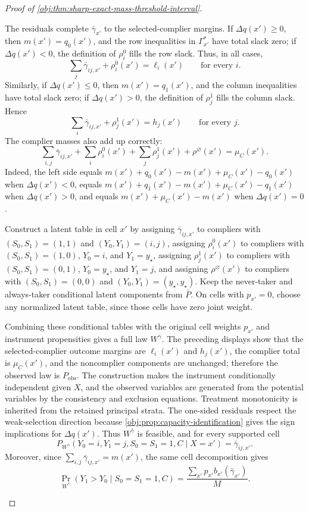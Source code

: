 \begin{proof}[Proof of \cref{obj:thm:sharp-exact-mass-threshold-interval}]
\begin{enumerate}
The residuals complete \(\bar\gamma_{x'}\) to the selected-complier margins.  If \(\Delta q(x')\ge0\), then \(m(x')=q_0(x')\), and the row inequalities in \(\Gamma_{x'}^\ast\) have total slack zero; if \(\Delta q(x')<0\), the definition of \(\rho_i^0\) fills the row slack.  Thus, in all cases,
\[
\sum_j\bar\gamma_{ij,x'}+\rho_i^0(x')=\ell_i(x')\qquad\text{for every }i.
\]
Similarly, if \(\Delta q(x')\le0\), then \(m(x')=q_1(x')\), and the column inequalities have total slack zero; if \(\Delta q(x')>0\), the definition of \(\rho_j^1\) fills the column slack.  Hence
\[
\sum_i\bar\gamma_{ij,x'}+\rho_j^1(x')=h_j(x')\qquad\text{for every }j.
\]
The complier masses also add up correctly:
\[
\sum_{i,j}\bar\gamma_{ij,x'}+
\sum_i\rho_i^0(x')+
\sum_j\rho_j^1(x')+\rho^\varnothing(x')
=\mu_C(x').
\]
Indeed, the left side equals \(m(x')+q_0(x')-m(x')+\mu_C(x')-q_0(x')\) when \(\Delta q(x')<0\), equals \(m(x')+q_1(x')-m(x')+\mu_C(x')-q_1(x')\) when \(\Delta q(x')>0\), and equals \(m(x')+\mu_C(x')-m(x')\) when \(\Delta q(x')=0\).

Construct a latent table in cell \(x'\) by assigning \(\bar\gamma_{ij,x'}\) to compliers with \((S_0,S_1)=(1,1)\) and \((Y_0,Y_1)=(i,j)\), assigning \(\rho_i^0(x')\) to compliers with \((S_0,S_1)=(1,0)\), \(Y_0=i\), and \(Y_1=y_\star\), assigning \(\rho_j^1(x')\) to compliers with \((S_0,S_1)=(0,1)\), \(Y_0=y_\star\), and \(Y_1=j\), and assigning \(\rho^\varnothing(x')\) to compliers with \((S_0,S_1)=(0,0)\) and \((Y_0,Y_1)=(y_\star,y_\star)\).  Keep the never-taker and always-taker conditional latent components from \(\bar P\).  On cells with \(p_{x'}=0\), choose any normalized latent table, since those cells have zero joint weight.

Combining these conditional tables with the original cell weights \(p_{x'}\) and instrument propensities gives a full law \(W^{\bar\gamma}\).  The preceding displays show that the selected-complier outcome margins are \(\ell_i(x')\) and \(h_j(x')\), the complier total is \(\mu_C(x')\), and the noncomplier components are unchanged; therefore the observed law is \(P_{\mathrm{obs}}\).  The construction makes the instrument conditionally independent given \(X\), and the observed variables are generated from the potential variables by the consistency and exclusion equations.  Treatment monotonicity is inherited from the retained principal strata.  The one-sided residuals respect the weak-selection direction because \cref{obj:prop:capacity-identification} gives the sign implications for \(\Delta q(x')\).  Thus \(W^{\bar\gamma}\) is feasible, and for every supported cell
\[
P_{W^{\bar\gamma}}(Y_0=i,Y_1=j,S_0=S_1=1,C\mid X=x')=\bar\gamma_{ij,x'}.
\]
Moreover, since \(\sum_{i,j}\bar\gamma_{ij,x'}=m(x')\), the same cell decomposition gives
\[
\Pr_{W^{\bar\gamma}}(Y_1>Y_0\mid S_0=S_1=1,C)
=
\frac{\sum_{x'}p_{x'}b_{x'}(\bar\gamma_{x'})}{M}.
\]



\end{enumerate}
\end{proof}
